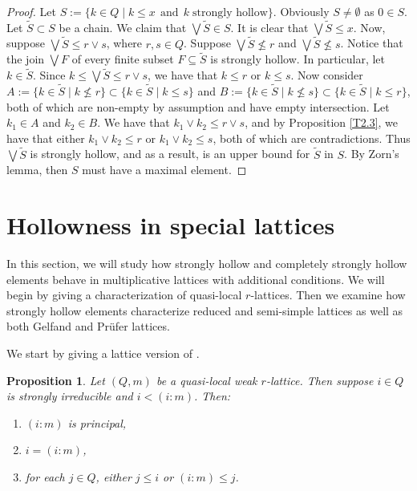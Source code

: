 \documentclass[11pt,english]{amsart}
\newtheorem{proposition}[theorem]{Proposition}
\theoremstyle{definition}
\numberwithin{equation}{section}
\theoremstyle{remark}
\def\leq{\leqslant}
\begin{document}
	\begin{proof}
		Let \(S:=\{k\in Q\mid  k\leq x \:\: \text{and} \:\: k\; \text{strongly hollow}\}\). Obviously \(S\neq\emptyset\) as $0\in S$. Let $\tilde{S}\subset S$ be a chain. We claim that $\bigvee\tilde{S}\in S$. It is clear that \(\bigvee\tilde{S}\leq x\). Now, suppose \(\bigvee\tilde{S}\leq r\vee s\), where \(r,s\in Q\). Suppose  $\bigvee\tilde{S}\nleq r$ and \(\bigvee\tilde{S}\nleq s\). Notice that the join $\bigvee F$ of every finite subset $F\subseteq\tilde{S}$ is strongly hollow. In particular, let $k\in\tilde{S}$. Since $k\leq\bigvee\tilde{S}\leq r\vee s$, we have that $k\leq r$ or $k\leq s$. Now consider $A:=\{k\in\tilde{S}\mid k\nleq r\}\subset\{k\in\tilde{S}\mid k\leq s\}$ and \(B:=\{k\in\tilde{S}\mid k\nleq s\}\subset\{k\in\tilde{S}\mid k\leq r\}\), both of which are non-empty by assumption and have empty intersection. Let $k_1\in A$ and $k_2\in B$. We have that $k_1\vee k_2\leq r\vee s$, and by Proposition \ref{T2.3}, we have that either $k_1\vee k_2\leq r$ or $k_1\vee k_2\leq s$, both of which are contradictions. Thus $\bigvee\tilde{S}$ is strongly hollow, and as a result, is an upper bound for $\tilde{S}$ in $S$. By Zorn's lemma, then $S$ must have a maximal element.
	\end{proof}
	\smallskip
	
	\section{Hollowness in special lattices}
	\label{hsl}
	
	In this section, we will study how strongly hollow and completely strongly hollow elements behave in multiplicative lattices with additional conditions. We will begin by giving a characterization of quasi-local $r$-lattices. Then we examine how strongly hollow elements characterize reduced and semi-simple lattices as well as both Gelfand and Pr\"ufer lattices.
	
	
	We start by giving a lattice version of \cite[Theorem~2.6]{Heinzer-Ratliff-Rush-2002}.
	\begin{proposition}\label{1}
		Let $(Q,m)$ be a quasi-local weak $r$-lattice. Then suppose $i\in Q$ is strongly irreducible and $i<(i:m)$. Then:
		\begin{enumerate}
			\item $(i:m)$ is principal,
			
			\item $i=(i:m)$,
			
			\item for each $j\in Q$, either $j\leq i$ or $(i:m)\leq j$.
		\end{enumerate}
	\end{proposition}
\end{document}
